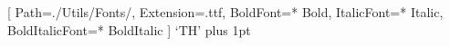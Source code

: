 \usepackage{apacite}
\usepackage{indentfirst}
\usepackage{fontspec}
\usepackage{xunicode}
\usepackage{xltxtra}
\usepackage{titlesec}
\usepackage{enumitem}
\usepackage[a4paper,left=25mm,right=25mm,top=25mm,bottom=25mm]{geometry}

\setmainfont{THSarabunNew}[
    Path=./Utils/Fonts/,
    Extension=.ttf,
    BoldFont=* Bold,
    ItalicFont=* Italic,
    BoldItalicFont=* BoldItalic
]
\XeTeXlinebreaklocale`TH'
\XeTeXlinebreakskip=0pt plus 1pt

\setlength{\parindent}{1cm}
